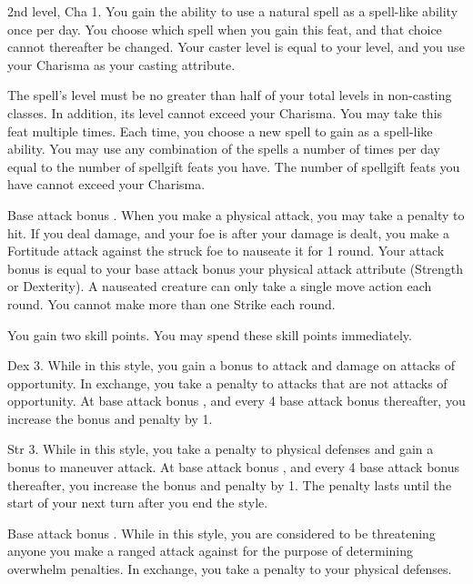 \featpre 2nd level, Cha 1.
\featben You gain the ability to use a natural spell as a spell-like ability once per day. You choose which spell when you gain this feat, and that choice cannot thereafter be changed. Your caster level is equal to your level, and you use your Charisma as your casting attribute.

The spell's level must be no greater than half of your total levels in non-casting classes. In addition, its level cannot exceed your Charisma.
 You may take this feat multiple times. Each time, you choose a new spell to gain as a spell-like ability. You may use any combination of the spells a number of times per day equal to the number of spellgift feats you have. The number of spellgift feats you have cannot exceed your Charisma.

\featpre Base attack bonus .
\featben When you make a physical attack, you may take a  penalty to hit. If you deal damage, and your foe is \bloodied after your damage is dealt, you make a Fortitude attack against the struck foe to nauseate it for 1 round. Your attack bonus is equal to your base attack bonus \add your physical attack attribute (Strength or Dexterity). A nauseated creature can only take a single move action each round. You cannot make more than one Strike each round.

 You gain two skill points. You may spend these skill points immediately.

 Dex 3.
 While in this style, you gain a  bonus to attack and damage on attacks of opportunity. In exchange, you take a  penalty to attacks that are not attacks of opportunity. At base attack bonus , and every 4 base attack bonus thereafter, you increase the bonus and penalty by 1.

 Str 3.
 While in this style, you take a  penalty to physical defenses and gain a  bonus to maneuver attack. At base attack bonus , and every 4 base attack bonus thereafter, you increase the bonus and penalty by 1. The penalty lasts until the start of your next turn after you end the style.

 Base attack bonus .
 While in this style, you are considered to be threatening anyone you make a ranged attack against for the purpose of determining overwhelm penalties. In exchange, you take a  penalty to your physical defenses.

